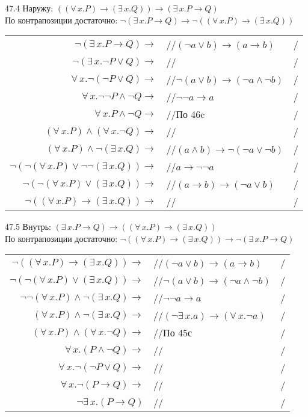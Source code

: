 \documentclass[12pt]{article}
\begin{document}
47.4 Наружу: $((\forall\,x.P)\to(\exists\,x.Q))\to(\exists\,x.P\to Q)$\\
По контрапозиции достаточно: $\neg(\exists\,x.P\to Q)\to\neg((\forall\,x.P)\to(\exists\,x.Q))$\\
\begin{tabular*}{\textwidth}{r l l}
	$\neg(\exists\,x.P\to Q)\to$&//$(\neg a\vee b)\to(a\to b)$&/\\
	$\neg(\exists\,x.\neg P\vee Q)\to$&//&/\\
	$\forall\,x.\neg(\neg P\vee Q)\to$&//$\neg(a\vee b)\to(\neg a\wedge\neg b)$&/\\
	$\forall\,x.\neg\neg P\wedge \neg Q\to$&//$\neg\neg a\to a$&/\\
	$\forall\,x.P\wedge \neg Q\to$&//По 46c&/\\
	$(\forall\,x.P)\wedge (\forall\,x.\neg Q)\to$&//&/\\
	$(\forall\,x.P)\wedge\neg(\exists\,x.Q)\to$&//$(a\wedge b)\to\neg(\neg a\vee\neg b)$&/\\
	$\neg(\neg(\forall\,x.P)\vee\neg\neg(\exists\,x.Q))\to$&//$a\to\neg\neg a$&/\\
	$\neg(\neg(\forall\,x.P)\vee(\exists\,x.Q))\to$&//$(a\to b)\to(\neg a\vee b)$&/\\
	$\neg((\forall\,x.P)\to(\exists\,x.Q))\to$&//&/\\
\end{tabular*}
47.5 Внутрь: $(\exists\,x.P\to Q)\to((\forall\,x.P)\to(\exists\,x.Q))$\\
По контрапозиции достаточно: $\neg((\forall\,x.P)\to(\exists\,x.Q))\to\neg(\exists\,x.P\to Q)$\\
\begin{tabular*}{\textwidth}{r l l}
	$\neg((\forall\,x.P)\to(\exists\,x.Q))\to$&//$(\neg a\vee b)\to(a\to b)$&/\\
	$\neg(\neg(\forall\,x.P)\vee(\exists\,x.Q))\to$&//$\neg(a\vee b)\to(\neg a\wedge\neg b)$&/\\
	$\neg\neg(\forall\,x.P)\wedge\neg(\exists\,x.Q)\to$&//$\neg\neg a\to a$&/\\
	$(\forall\,x.P)\wedge\neg(\exists\,x.Q)\to$&//$(\neg\exists\,x.a)\to(\forall\,x.\neg a)$&/\\
	$(\forall\,x.P)\wedge(\forall\,x.\neg Q)\to$&//По 45с&/\\
	$\forall\,x.(P\wedge\neg Q)\to$&//&/\\
	$\forall\,x.\neg(\neg P\vee Q)\to$&//&/\\
	$\forall\,x.\neg(P\to Q)\to$&//&/\\
	$\neg\exists\,x.(P\to Q)$&//&/\\
\end{tabular*}
\end{document}
